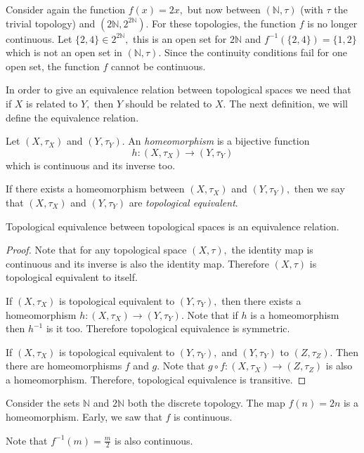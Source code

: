 \documentclass[
	fontsize=10pt, %
	twoside=false, %
	secnumdepth=1, %
]{kaobook}
\begin{document}
\begin{example}
Consider again the function $f(x)=2x,$ but now between $(\mathbb{N},\tau)$ (with $\tau$ the trivial topology) and $(2\mathbb{N},2^{2\mathbb{N}}).$ For these topologies, the function $f$ is no longer continuous. Let $\{2,4\}\in 2^{2\mathbb{N}},$ this is an open set for $2\mathbb{N}$ and $f^{-1}(\{2,4\})=\{1,2\}$ which is not an open set in $(\mathbb{N},\tau).$ Since the continuity conditions fail for one open set, the function $f$ cannot be continuous.  
\end{example}

In order to give an equivalence relation between topological spaces we need that if $X$ is related to $Y,$ then $Y$ should be related to $X.$ The next definition, we will define the equivalence relation.

\begin{definition}
Let $(X,\tau_X)$ and $(Y,\tau_Y).$ An \emph{homeomorphism} is a bijective function $$h:(X,\tau_X)\to (Y,\tau_Y)$$ which is continuous and its inverse too.

If there exists a homeomorphism between $(X,\tau_X)$ and $(Y,\tau_Y),$ then we say that $(X,\tau_X)$ and $(Y,\tau_Y)$ are \emph{topological equivalent}.
\end{definition}

\begin{proposition}
Topological equivalence between topological spaces is an equivalence relation.
\end{proposition}
\begin{proof}
Note that for any topological space $(X,\tau),$ the identity map is continuous and its inverse is also the identity map. Therefore $(X,\tau)$ is topological equivalent to itself.

If $(X,\tau_X)$ is topological equivalent to $(Y,\tau_Y),$ then there exists a homeomorphism  $h:(X,\tau_X)\to (Y,\tau_Y).$ Note that if $h$ is a homeomorphism then $h^{-1}$ is it too. Therefore topological equivalence is symmetric.

If $(X,\tau_X)$ is topological equivalent to $(Y,\tau_Y),$ and $(Y,\tau_Y)$ to $(Z,\tau_Z).$ Then there are homeomorphisms $f$ and $g.$ Note that $g\circ f:(X,\tau_X)\to(Z,\tau_Z)$ is also a homeomorphism. Therefore, topological equivalence is transitive.
\end{proof}

\begin{example}
Consider the sets $\mathbb{N}$ and $2\mathbb{N}$ both the discrete topology. The map $f(n)=2n$ is a homeomorphism. Early, we saw that $f$ is continuous. 

Note that $f^{-1}(m)=\frac{m}{2}$ is also continuous.
\end{example}
\end{document}
